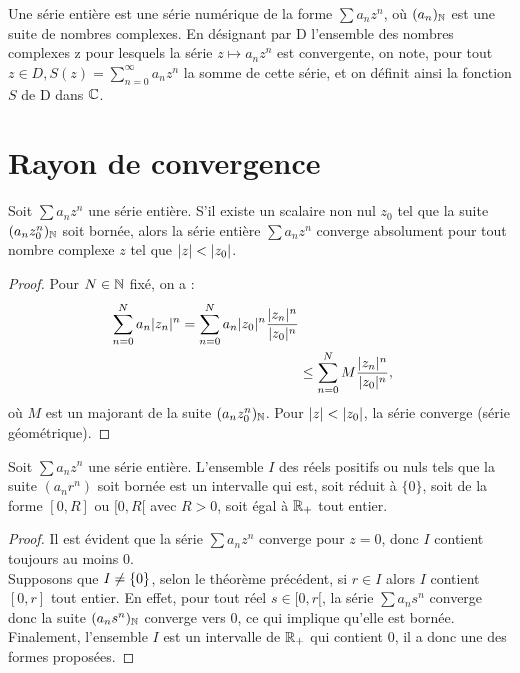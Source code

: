 \documentclass[french]{article}
\begin{document}
\begin{defn}
Une série entière est une série numérique de la forme $\sum a_n z^n$, où $(a_n)_{\mathbb{N}}$ est une suite de nombres complexes.
En désignant par D l’ensemble des nombres complexes z pour lesquels la série $z \mapsto a_n z^n$ est convergente, on note,
pour tout $z \in D, S(z) =  \sum_{n=0}^{\infty} a_n z^n$ la somme de cette série, et on définit ainsi la fonction $S$ de D dans $\mathbb{C}$.
\end{defn}

\section{Rayon de convergence}

\begin{thm}[Abel]
Soit $\sum a_n z^n$ une série entière. S'il existe un scalaire non nul $z_0$ tel que la suite $(a_n z_0^n)_{\mathbb{N}}$ soit bornée, alors la 
série entière $\sum a_n z^n$ converge absolument pour tout nombre complexe $z$ tel que $\lvert z\rvert < \lvert z_0\rvert$.
\end{thm}

\begin{proof}
Pour $N \in \mathbb{N}$ fixé, on a :
\begin{align*}
\sum_{n=0}^N a_n \lvert z_n\rvert^n = \sum _{n=0}^N a_n \lvert z_0\rvert^n \dfrac{\lvert z_n\rvert^n}{\lvert z_0\rvert^n} \\
& \leq \sum _{n=0}^N M \dfrac{\lvert z_n\rvert^n}{\lvert z_0\rvert^n} ,
\end{align*}
où $M$ est un majorant de la suite $(a_n z_0^n)_{\mathbb{N}}$. Pour $\lvert z\rvert < \lvert z_0\rvert$, la série converge (série géométrique).
\end{proof}

\begin{thm}
Soit $\sum a_n z^n$ une série entière. L'ensemble $I$ des réels positifs ou nuls tels que la suite $(a_n r^n)$ soit bornée est un 
intervalle qui est, soit réduit à $\{0\}$, soit de la forme $[0,R]$ ou $[0,R[$ avec $R >0$, soit égal à $\mathbb{R}_+$ tout entier.
\end{thm}

\begin{proof}
Il est évident que la série $\sum a_n z^n$ converge pour $z=0$, donc $I$ contient toujours au moins $0$. \\
Supposons que $I \neq \{ 0 \}$, selon le théorème précédent, si $r \in I$ alors $I$ contient $[0,r]$ tout entier. En effet, pour tout 
réel $s \in [0,r[$, la série $\sum a_n s^n$ converge donc la suite $(a_n s^n)_{\mathbb{N}}$ converge vers 0, ce qui implique qu'elle est bornée. \\
Finalement, l'ensemble $I$ est un intervalle de $\mathbb{R}_+$ qui contient 0, il a donc une des formes proposées.
\end{proof}
\end{document}
